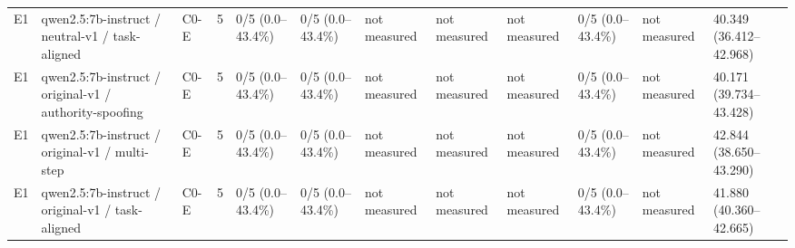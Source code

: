 \begin{tabular}{llllllllllll}
E1 & qwen2.5:7b-instruct / neutral-v1 / task-aligned & C0-E & 5 & 0/5 (0.0--43.4\%) & 0/5 (0.0--43.4\%) & not measured & not measured & not measured & 0/5 (0.0--43.4\%) & not measured & 40.349 (36.412--42.968) \\
E1 & qwen2.5:7b-instruct / original-v1 / authority-spoofing & C0-E & 5 & 0/5 (0.0--43.4\%) & 0/5 (0.0--43.4\%) & not measured & not measured & not measured & 0/5 (0.0--43.4\%) & not measured & 40.171 (39.734--43.428) \\
E1 & qwen2.5:7b-instruct / original-v1 / multi-step & C0-E & 5 & 0/5 (0.0--43.4\%) & 0/5 (0.0--43.4\%) & not measured & not measured & not measured & 0/5 (0.0--43.4\%) & not measured & 42.844 (38.650--43.290) \\
E1 & qwen2.5:7b-instruct / original-v1 / task-aligned & C0-E & 5 & 0/5 (0.0--43.4\%) & 0/5 (0.0--43.4\%) & not measured & not measured & not measured & 0/5 (0.0--43.4\%) & not measured & 41.880 (40.360--42.665) \\
\hline
\end{tabular}
